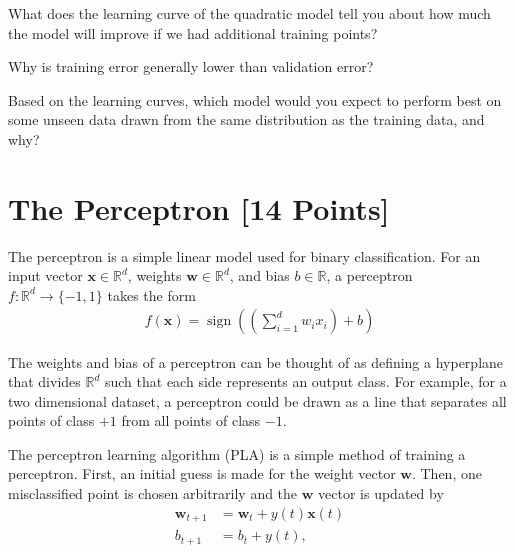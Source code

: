 \begin{problem}[3]
What does the learning curve of the quadratic model tell you about how much the model will improve if we had additional training points?
\end{problem}
\begin{solution}

\end{solution}

\begin{problem}[3]
Why is training error generally lower than validation error?
\end{problem}
\begin{solution}

\end{solution}

\begin{problem}[3]
Based on the learning curves, which model would you expect to perform best on some unseen data drawn from the same distribution as the training data, and why?
\end{problem}
\begin{solution}

\end{solution}

\newpage
\section{The Perceptron [14 Points]}

The perceptron is a simple linear model used for binary classification.
For an input vector $\mathbf{x} \in \mathbb{R}^d$, weights $\mathbf{w} \in \mathbb{R}^d$, and bias $b \in \mathbb{R}$, a perceptron $f: \mathbb{R}^d \rightarrow \{-1,1\}$ takes the form
\begin{align*}
	f(\mathbf{x}) = \operatorname{sign}\left(\left(\sum_{i=1}^d w_i x_i\right) + b \right)
\end{align*}

The weights and bias of a perceptron can be thought of as defining a hyperplane that divides $\mathbb{R}^d$ such that each side represents an output class. For example, for a two dimensional dataset, a perceptron could be drawn as a line that separates all points of class $+1$ from all points of class $-1$.

The perceptron learning algorithm (PLA) is a simple method of training a perceptron.
First, an initial guess is made for the weight vector $\mathbf{w}$.
Then, one misclassified point is chosen arbitrarily and the $\mathbf{w}$ vector is updated by
\begin{align*}
	\mathbf{w}_{t+1} & = \mathbf{w}_t + y(t)\mathbf{x}(t) \\
	b_{t + 1}        & = b_t + y(t),
\end{align*}

